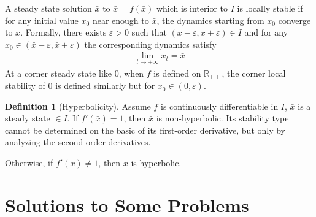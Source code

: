 \documentclass[11pt,a4paper]{book}
\theoremstyle{definition}\newtheorem{definition}{Definition}
\theoremstyle{definition}\newtheorem{fact}{Fact}
\theoremstyle{definition}\newtheorem{remark}{Remark}
\theoremstyle{definition}\newtheorem{ex}{Ex.}
\theoremstyle{definition}\newtheorem{project}{Project}
\theoremstyle{definition}\newtheorem{problem}{Problem}
\theoremstyle{definition}\newtheorem{example}{Example}
\numberwithin{theorem}{section}
\numberwithin{corollary}{chapter}
\numberwithin{assumption}{chapter}
\numberwithin{definition}{chapter}
\numberwithin{prop}{chapter}
\numberwithin{notation}{chapter}
\numberwithin{problem}{chapter}
\numberwithin{example}{chapter}
\numberwithin{fact}{chapter}
\numberwithin{ex}{chapter}
\def\R{\mathbb R}
\def\R{\mathbb R}
\begin{document}
\begin{appendices}
	A steady state solution $\bar{x}$ to $\bar{x} = f(\bar{x})$ which is interior to $I$ is locally stable if for any initial value $x_0$ near enough to $\bar{x}$, the dynamics starting from $x_0$ converge to $\bar{x}$. Formally, there exists $\varepsilon > 0$ such that $(\bar{x}-\varepsilon, \bar{x} + \varepsilon) \in I$ and for any $x_0 \in (\bar{x}-\varepsilon, \bar{x} + \varepsilon)$ the corresponding dynamics satisfy
	\begin{align*}
		\lim_{t\to +\infty} x_t = \bar{x}
	\end{align*}
	At a corner steady state like 0, when $f$ is defined on $\R_{++}$, the corner local stability of 0 is defined similarly but for $x_0 \in (0,\varepsilon)$.
	
	\begin{definition}[Hyperbolicity]
		Assume $f$ is continuously differentiable in $I$, $\bar{x}$ is a steady state $\in I$. If $f'(\bar{x}) =1$, then $\bar{x}$ is non-hyperbolic. Its stability type cannot be determined on the basic of its first-order derivative, but only by analyzing the second-order derivatives. 
		
		Otherwise, if $f'(\bar{x}) \neq 1$, then $\bar{x}$ is hyperbolic.
	\end{definition}	
	
	\chapter{Solutions to Some Problems}

\end{appendices}
\end{document}
